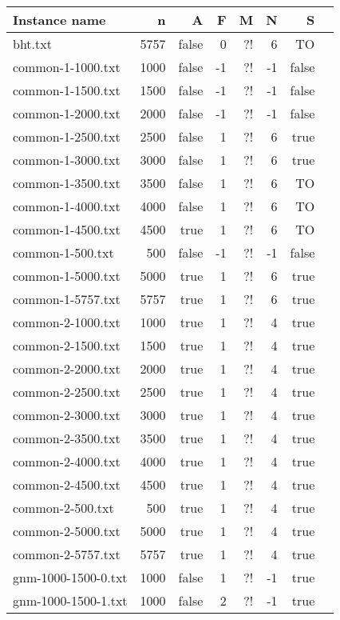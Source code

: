 \medskip
\begin{tabular}{lrrrrrrr}
  \toprule
  Instance name & n & A & F & M & N & S \\
  \midrule
  bht.txt & 5757 & false & 0 & ?! & 6 & TO \\
  common-1-1000.txt & 1000 & false & -1 & ?! & -1 & false \\
  common-1-1500.txt & 1500 & false & -1 & ?! & -1 & false \\
  common-1-2000.txt & 2000 & false & -1 & ?! & -1 & false \\
  common-1-2500.txt & 2500 & false & 1 & ?! & 6 & true \\
  common-1-3000.txt & 3000 & false & 1 & ?! & 6 & true \\
  common-1-3500.txt & 3500 & false & 1 & ?! & 6 & TO \\
  common-1-4000.txt & 4000 & false & 1 & ?! & 6 & TO \\
  common-1-4500.txt & 4500 & true & 1 & ?! & 6 & TO \\
  common-1-500.txt & 500 & false & -1 & ?! & -1 & false \\
  common-1-5000.txt & 5000 & true & 1 & ?! & 6 & true \\
  common-1-5757.txt & 5757 & true & 1 & ?! & 6 & true \\
  common-2-1000.txt & 1000 & true & 1 & ?! & 4 & true \\
  common-2-1500.txt & 1500 & true & 1 & ?! & 4 & true \\
  common-2-2000.txt & 2000 & true & 1 & ?! & 4 & true \\
  common-2-2500.txt & 2500 & true & 1 & ?! & 4 & true \\
  common-2-3000.txt & 3000 & true & 1 & ?! & 4 & true \\
  common-2-3500.txt & 3500 & true & 1 & ?! & 4 & true \\
  common-2-4000.txt & 4000 & true & 1 & ?! & 4 & true \\
  common-2-4500.txt & 4500 & true & 1 & ?! & 4 & true \\
  common-2-500.txt & 500 & true & 1 & ?! & 4 & true \\
  common-2-5000.txt & 5000 & true & 1 & ?! & 4 & true \\
  common-2-5757.txt & 5757 & true & 1 & ?! & 4 & true \\
  gnm-1000-1500-0.txt & 1000 & false & 1 & ?! & -1 & true \\
  gnm-1000-1500-1.txt & 1000 & false & 2 & ?! & -1 & true \\

\end{tabular}
